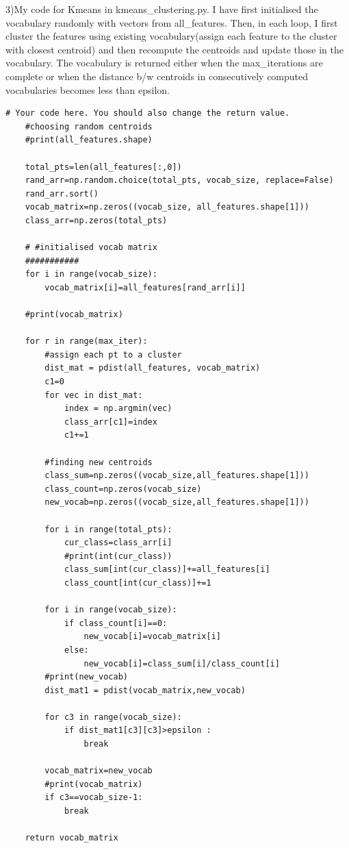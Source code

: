 3)My code for Kmeans in kmeans\_clustering.py. I have first initialised the vocabulary randomly with vectors from all\_features. Then, in each loop, I first cluster the features using existing vocabulary(assign each feature to the cluster with closest centroid) and then recompute the centroids and update those in the vocabulary. The vocabulary is returned either when the max\_iterations are complete or when the distance b/w centroids in consecutively computed vocabularies becomes less than epsilon.
\begin{lstlisting}[style=Matlab-editor]
# Your code here. You should also change the return value.
    #choosing random centroids
    #print(all_features.shape)

    total_pts=len(all_features[:,0])
    rand_arr=np.random.choice(total_pts, vocab_size, replace=False)
    rand_arr.sort()
    vocab_matrix=np.zeros((vocab_size, all_features.shape[1]))
    class_arr=np.zeros(total_pts)

    # #initialised vocab matrix
    ###########
    for i in range(vocab_size):
        vocab_matrix[i]=all_features[rand_arr[i]]

    #print(vocab_matrix)
    
    for r in range(max_iter):
        #assign each pt to a cluster
        dist_mat = pdist(all_features, vocab_matrix)
        c1=0
        for vec in dist_mat:
            index = np.argmin(vec)
            class_arr[c1]=index
            c1+=1

        #finding new centroids
        class_sum=np.zeros((vocab_size,all_features.shape[1]))
        class_count=np.zeros(vocab_size)
        new_vocab=np.zeros((vocab_size,all_features.shape[1]))

        for i in range(total_pts):
            cur_class=class_arr[i]
            #print(int(cur_class))
            class_sum[int(cur_class)]+=all_features[i]
            class_count[int(cur_class)]+=1

        for i in range(vocab_size):
            if class_count[i]==0:
                new_vocab[i]=vocab_matrix[i]
            else:
                new_vocab[i]=class_sum[i]/class_count[i]
        #print(new_vocab)
        dist_mat1 = pdist(vocab_matrix,new_vocab)

        for c3 in range(vocab_size):
            if dist_mat1[c3][c3]>epsilon :
                break

        vocab_matrix=new_vocab
        #print(vocab_matrix)
        if c3==vocab_size-1:
            break

    return vocab_matrix
\end{lstlisting}

